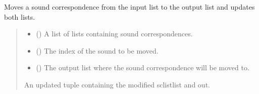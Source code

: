 \documentclass[letterpaper,10pt,english]{sphinxmanual}
\begin{document}

\begin{fulllineitems}
\label{\detokenize{documentation:loanpy.scapplier.move_sc}}
\pysigstartsignatures
{}
\pysigstopsignatures
\sphinxAtStartPar
Moves a sound correspondence from the input list to the output
list and updates both lists.
\begin{quote}\begin{description}
\begin{itemize}
\item {} 
\sphinxAtStartPar
{} () \textendash{} A list of lists containing sound correspondences.

\item {} 
\sphinxAtStartPar
{} () \textendash{} The index of the sound to be moved.

\item {} 
\sphinxAtStartPar
{} () \textendash{} The output list where the sound correspondence will be
moved to.

\end{itemize}

\sphinxAtStartPar
An updated tuple containing the modified sclistlist and out.


\end{description}
\end{quote}
\end{fulllineitems}
\end{document}

